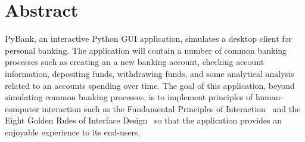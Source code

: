 \section{Abstract}
\label{sect:abstract}

PyBank, an interactive Python GUI application, simulates a desktop client for personal banking. The application will contain a number of common banking processes such as creating an a new banking account, checking account information, depositing funds, withdrawing funds, and some analytical analysis related to an accounts spending over time. The goal of this application, beyond simulating common banking processes, is to implement principles of human-computer interaction such as the Fundamental Principles of Interaction~\cite{THE_DESIGN_OF_EVERYDAY_THINGS:1} and the Eight Golden Rules of Interface Design~\cite{DESIGNING_THE_USER_INTERFACE:2} so that the application provides an enjoyable experience to its end-users. 


